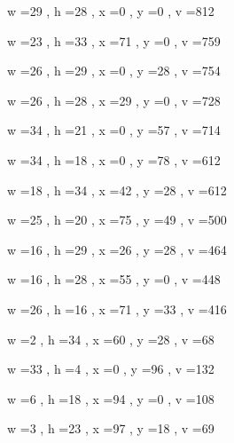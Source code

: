 \documentclass[11pt]{article}
\begin{document}
w =29 , h =28 , x =0 , y =0 , v =812
\par
w =23 , h =33 , x =71 , y =0 , v =759
\par
w =26 , h =29 , x =0 , y =28 , v =754
\par
w =26 , h =28 , x =29 , y =0 , v =728
\par
w =34 , h =21 , x =0 , y =57 , v =714
\par
w =34 , h =18 , x =0 , y =78 , v =612
\par
w =18 , h =34 , x =42 , y =28 , v =612
\par
w =25 , h =20 , x =75 , y =49 , v =500
\par
w =16 , h =29 , x =26 , y =28 , v =464
\par
w =16 , h =28 , x =55 , y =0 , v =448
\par
w =26 , h =16 , x =71 , y =33 , v =416
\par
w =2 , h =34 , x =60 , y =28 , v =68
\par
w =33 , h =4 , x =0 , y =96 , v =132
\par
w =6 , h =18 , x =94 , y =0 , v =108
\par
w =3 , h =23 , x =97 , y =18 , v =69
\par
\newpage
\end{document}
